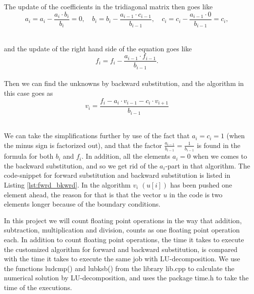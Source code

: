 \documentclass[12pt]{article}
\begin{document}
\begin{flushleft}
\newpage
The update of the coefficients in the tridiagonal matrix then goes like\\

$$a_i = a_i - \frac{a_i\cdot b_i}{b_i} = 0,\quad b_i = b_i - \frac{a_{i-1}\cdot c_{i-1}}{b_{i-1}},\quad c_i = c_i - \frac{a_{i-1}\cdot 0}{b_{i-1}} = c_i,$$\\
\vspace{5mm}

and the update of the right hand side of the equation goes like\\

$$f_i = f_i - \frac{a_{i-1}\cdot f_{i-1}}{b_{i-1}}.$$\\

Then we can find the unknowns by backward substitution, and the algorithm in this case goes as\\

$$v_i = \frac{f_i - a_i\cdot v_{i-1} - c_i\cdot v_{i+1}}{b_{i-1}}$$\\
\vspace{5mm}

We can take the simplifications further by use of the fact that $a_i = c_i = 1$ (when the minus sign is factorized out), and that the factor $\frac{a_{i-1}}{b_{i-1}} = \frac{1}{b_{i-1}}$ is found in the formula for both $b_i$ and $f_i$.  In addition, all the elements $a_i = 0$ when we comes to the backward substitution, and so we get rid of the $a_i$-part in that algorithm. The code-snippet for forward substitution and backward substitution is listed in Listing \ref{lst:fwrd_bkwrd}. In the algorithm $v_i$ $(u[i])$ has been pushed one element ahead, the reason for that is that the vector $u$ in the code is two elements longer because of the boundary conditions.\\
\vspace{5mm}

In this project we will count floating point operations in the way that addition, subtraction, multiplication and division, counts as one floating point operation each. In addition to count floating point operations, the time it takes to execute the customized algorithm for forward and backward substitution, is compared with the time it takes to execute the same job with LU-decomposition. We use the functions ludcmp() and lubksb() from the library lib.cpp to calculate the numerical solution by LU-decomposition, and uses the package time.h to take the time of the executions. 


\end{flushleft}
\end{document}
